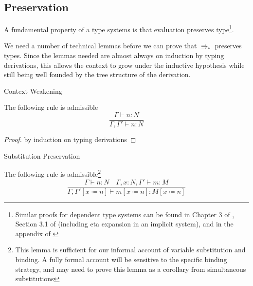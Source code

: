\subsection{Preservation}

A fundamental property of a type systems is that evaluation preserves type\footnote{Similar proofs for dependent type systems can be found in Chapter 3 of \cite{luo1994computation}, Section 3.1 of \cite{10.1007/3-540-45413-6_27}(including eta expansion in an implicit system), and in the appendix of \cite{sjoberg2012irrelevance}}.

We need a number of technical lemmas before we can prove that $\Rrightarrow_{\ast}$ preserves types.
Since the lemmas needed are almost always on induction by typing derivations, this allows the context to grow under the inductive hypothesis while still being well founded by the tree structure of the derivation. 

\begin{thm}
Context Weakening

The following rule is admissible
\[
\frac{\Gamma\vdash n:N}{\Gamma,\Gamma'\vdash n:N}
\]
\end{thm}

\begin{proof}
by induction on typing derivations
\end{proof}
\begin{lem}
Substitution Preservation

The following rule is admissible\footnote{
This lemma is sufficient for our informal account of variable substitution and binding.
A fully formal account will be sensitive to the specific
binding strategy, and may need to prove this lemma as a corollary
from simultaneous substitutions}
\[
\frac{\Gamma\vdash n:N\quad\Gamma,x:N,\Gamma'\vdash m:M}{\Gamma,\Gamma'\left[x\coloneqq n\right]\vdash m\left[x\coloneqq n\right]:M\left[x\coloneqq n\right]}
\]
\end{lem}

